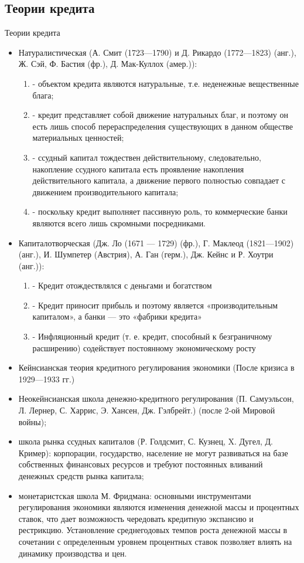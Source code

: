 \documentclass[_DKB_p2_Credit.tex]{subfiles}
\begin{document}
\subsection{Теории кредита}
\begin{frame}[allowframebreaks]{Теории кредита}
\begin{itemize}
\item
Натуралистическая (А. Смит (1723—1790) и Д. Рикардо (1772—1823) (анг.), Ж. Сэй, Ф. Бастия (фр.), Д. Мак-Куллох (амер.)):
\begin{enumerate}
\item
- объектом кредита являются натуральные, т.е. неденежные вещественные блага;
\item
- кредит представляет собой движение натуральных благ, и поэтому он есть лишь способ перераспределения существующих в данном обществе материальных ценностей;
\pagebreak
\item
- ссудный капитал тождествен действительному, следовательно, накопление ссудного капитала есть проявление накопления действительного капитала, а движение первого полностью совпадает с движением производительного капитала;
\item
- поскольку кредит выполняет пассивную роль, то коммерческие банки являются всего лишь скромными посредниками.
\end{enumerate}
\pagebreak
\item
Капиталотворческая (Дж. Ло (1671 — 1729) (фр.), Г. Маклеод (1821—1902) (анг.), И. Шумпетер (Австрия), А. Ган (герм.), Дж. Кейнс и Р. Хоутри (анг.)):
\begin{enumerate}
\item
- Кредит отождествлялся с деньгами и богатством
\item
- Кредит приносит прибыль и поэтому является «производительным капиталом», а банки — это «фабрики кредита»
\item
- Инфляционный кредит (т. е. кредит, способный к безграничному расширению) содействует постоянному экономическому росту
\end{enumerate}

\pagebreak
\item
Кейнсианская теория кредитного регулирования экономики (После кризиса в 1929—1933 гг.)
\item
Неокейнсианская школа денежно-кредитного регулирования (П. Самуэльсон, Л. Лернер, С. Харрис, Э. Хансен, Дж. Гэлбрейт.) (после 2-ой Мировой войны);
\pagebreak
\item
школа рынка ссудных капиталов (Р. Голдсмит, С. Кузнец, X. Дугел, Д. Кример): корпорации, государство, население не могут развиваться на базе собственных финансовых ресурсов и требуют постоянных вливаний денежных средств рынка капитала;
\item
монетаристская школа М. Фридмана: основными инструментами регулирования экономики являются изменения денежной массы и процентных ставок, что дает возможность чередовать кредитную экспансию и рестрикцию. Установление среднегодовых темпов роста денежной массы в сочетании с определенным уровнем процентных ставок позволяет влиять на динамику производства и цен.
\end{itemize}
\end{frame}

\end{document}
